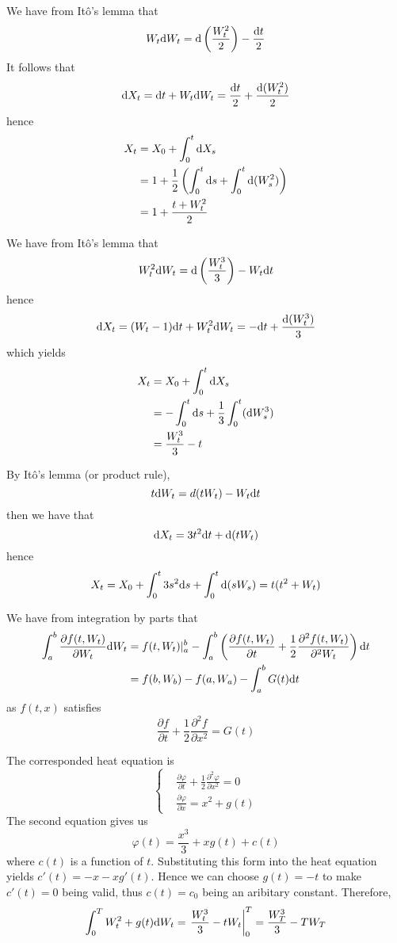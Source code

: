\documentclass{homework}
\begin{document}
    \problem
    \begin{subproblem}[(\alph*)]
        \item
        We have from It\^o's lemma that
        \[W_t\mathrm d W_t=\mathrm d\left(\frac{W_t^2}{2}\right)-\frac{\mathrm d t}{2}\]
        It follows that
        \[\mathrm d X_t=\mathrm d t+W_t\mathrm d W_t=\frac{\mathrm d t}{2}+\frac{\mathrm d (W_t^2)}{2}\]
        hence
        \[\begin{aligned}
            X_t&=X_0+\int_0^t\mathrm d X_s\\
            &=1+\frac{1}{2}\left(\int_0^t\mathrm d s+\int_0^t\mathrm d(W_s^2)\right)\\
            &=1+\frac{t+W_t^2}{2}
        \end{aligned}\]

        \item
        We have from It\^o's lemma that
        \[W_t^2\mathrm d W_t=\mathrm d\left(\frac{W_t^3}{3}\right)-W_t\mathrm d t\]
        hence
        \[\mathrm d X_t=(W_t-1)\mathrm d t+W_t^2\mathrm d W_t=-\mathrm d t+\frac{\mathrm d(W_t^3)}{3}\]
        which yields
        \[\begin{aligned}
            X_t&=X_0+\int_0^t\mathrm d X_s\\
            &=-\int_0^t\mathrm d s+\frac{1}{3}\int_0^t(\mathrm d W_s^3)\\
            &=\frac{W_t^3}{3}-t
        \end{aligned}\]

        \item
        By It\^o's lemma (or product rule),
        \[t\mathrm d W_t=d(tW_t)-W_t\mathrm d t\]
        then we have that
        \[\mathrm d X_t=3t^2\mathrm d t+\mathrm d(tW_t)\]
        hence
        \[X_t=X_0+\int_0^t3s^2\mathrm d s+\int_0^t\mathrm d (sW_s)=t(t^2+W_t)\]
    \end{subproblem}

    \problem
    We have from integration by parts that
    \[\begin{aligned}
        \int_a^b\frac{\partial f(t,W_t)}{\partial W_t}\mathrm d W_t
        &=f(t,W_t)|_a^b
        -\int_a^b\left(\frac{\partial f(t,W_t)}{\partial t}
        +\frac{1}{2}\frac{\partial^2 f(t,W_t)}{\partial^2 W_t}\right)
        \mathrm d t\\
        &=f(b,W_b)-f(a,W_a)-\int_a^bG(t)\mathrm d t
    \end{aligned}\]
    as $f(t,x)$ satisfies
    \[\frac{\partial f}{\partial t}+\frac{1}{2}\frac{\partial^2 f}{\partial x^2}=G(t)\]

    \problem
    The corresponded heat equation is
    \[\left\{\begin{aligned}
        &\frac{\partial\varphi}{\partial t}
        +\frac{1}{2}\frac{\partial^2\varphi}{\partial x^2}=0\\
        &\frac{\partial\varphi}{\partial x}=x^2+g(t)
    \end{aligned}\right.\]
    The second equation gives us
    \[\varphi(t)=\frac{x^3}{3}+xg(t)+c(t)\]
    where $c(t)$ is a function of $t$. Substituting this form into
    the heat equation yields $c'(t)=-x-xg'(t)$. Hence we can choose
    $g(t)=-t$ to make $c'(t)=0$ being valid, thus $c(t)=c_0$ being an aribitary
    constant. Therefore,
    \[\int_0^TW_t^2+g(t)\mathrm d W_t=\left.\frac{W_t^3}{3}-tW_t\right|_0^T
    =\frac{W_T^3}{3}-TW_T\]
\end{document}
